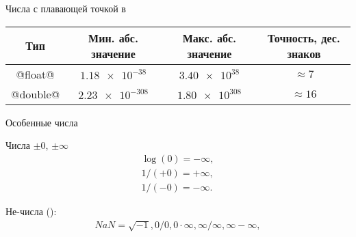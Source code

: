 \begin{frame}[fragile]{Числа с плавающей точкой в }

  \begin{table}
    \begin{tabular}{cccc}
      \hline
      Тип      & Мин. абс. значение & Макс. абс. значение & Точность, дес. знаков \\
      \hline
      @float@  & $\num{1.18e-38}$   & $\num{3.40e38}$     & $\approx 7$ \\
      @double@ & $\num{2.23e-308}$  & $\num{1.80e308}$    & $\approx 16$ \\
      \hline
    \end{tabular}
  \end{table}



\end{frame}

\begin{frame}{Особенные числа}

  \begin{block}{Числа $\pm 0$, $\pm \infty$}
    \reduceBlockEqSpacing
    \begin{gather*}
      \log(0) = -\infty, \\
      1 / (+0) = +\infty, \\
      1 / (-0) = -\infty.
    \end{gather*}
  \end{block}

  \pause

  \newcommand{\NaN}{NaN}

  \begin{block}{Не-числа ():}
    \reduceBlockEqSpacing
    \begin{gather*}
      \NaN = \sqrt{-1}, 0 / 0, 0 \cdot \infty, \infty / \infty, \infty - \infty, \\
    \end{gather*}
  \end{block}

  \let\NaN\undefined


\end{frame}

